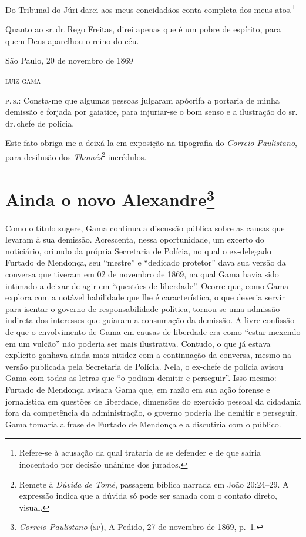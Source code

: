 Do Tribunal do Júri darei aos meus concidadãos conta completa dos meus
atos.\footnote{Refere-se à acusação da qual trataria de se defender e
  de que sairia inocentado por decisão unânime dos jurados.}

Quanto ao sr.\,dr.\,Rego Freitas, direi apenas que é um pobre de espírito,
para quem Deus aparelhou o reino do céu.

\begin{flushright}
São Paulo, 20 de novembro de 1869

\textsc{luiz gama}
\end{flushright}

\textsc{p.\,s.:} Consta-me que algumas pessoas julgaram apócrifa a portaria de
minha demissão e forjada por gaiatice, para injuriar-se o bom senso e a
ilustração do sr.\,dr.\,chefe de polícia.

Este fato obriga-me a deixá-la em exposição na tipografia do
\emph{Correio Paulistano}, para desilusão dos \emph{Thomés}\footnote{
  Remete à \emph{Dúvida de Tomé}, passagem bíblica narrada em João
  20:24--29. A expressão indica que a dúvida só pode ser sanada com o
  contato direto, visual.} incrédulos.

\chapter{Ainda o novo Alexandre\footnote{\emph{Correio Paulistano}
  (\textsc{sp}), A Pedido, 27 de novembro de 1869, p.~1.}}

\begin{didascalia}
Como o título sugere, Gama continua a discussão pública sobre as causas
que levaram à sua demissão. Acrescenta, nessa oportunidade, um excerto
do noticiário, oriundo da própria Secretaria de Polícia, no qual o
ex-delegado Furtado de Mendonça, seu ``mestre'' e ``dedicado protetor'' dava
sua versão da conversa que tiveram em 02 de novembro de 1869, na qual Gama havia
sido intimado a deixar de agir em ``questões de liberdade''. Ocorre que,
como Gama explora com a notável habilidade que lhe é característica, o
que deveria servir para isentar o governo de responsabilidade política,
tornou-se uma admissão indireta dos interesses que guiaram a consumação
da demissão. A livre confissão de que o envolvimento de Gama em causas
de liberdade era como ``estar mexendo em um vulcão'' não poderia ser mais
ilustrativa. Contudo, o que já estava explícito ganhava ainda mais
nitidez com a continuação da conversa, mesmo na versão publicada pela
Secretaria de Polícia. Nela, o ex-chefe de polícia avisou Gama com todas
as letras que ``o podiam demitir e perseguir''. Isso mesmo: Furtado de
Mendonça avisara Gama que, em razão em sua ação forense e jornalística
em questões de liberdade, dimensões do exercício pessoal da cidadania
fora da competência da administração, o governo poderia lhe demitir e
perseguir. Gama tomaria a frase de Furtado de Mendonça e a discutiria
com o público.
\end{didascalia}



